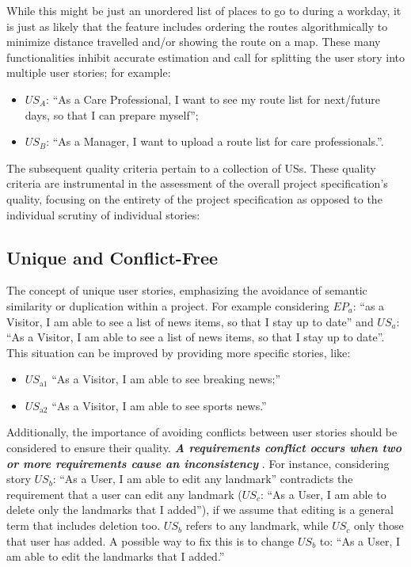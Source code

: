 While this might be just an unordered list of places to go to during a workday, it is just as likely that the feature includes ordering the routes algorithmically to minimize distance travelled and/or showing the route on a map. These many functionalities inhibit accurate estimation and call for splitting the user story into multiple user stories; for example:
\begin{itemize}
\item $US_A$: \enquote{As a Care Professional, I want to see my route list for next/future days, so that I can prepare myself};
\item $US_B$: \enquote{As a Manager, I want to upload a route list for care professionals.}.
\end{itemize}

The subsequent quality criteria pertain to a collection of USs. These quality criteria are instrumental in the assessment of the overall project specification's quality, focusing on the entirety of the project specification as opposed to the individual scrutiny of individual stories:
\subsection*{\normalsize{Unique and Conflict-Free}}
The concept of unique user stories, emphasizing the avoidance of semantic similarity or duplication within a project. For example considering $EP_a$: \enquote{as a Visitor, I am able to see a list of news items, so that I stay up to date} and $US_a$: \enquote{As a Visitor, I am able to see a list of news items, so that I stay up to date}. This situation can be improved by providing more specific stories, like:
\begin{itemize}
\item $US_{\text{a1}}$ \enquote{As a Visitor, I am able to see breaking news;}
\item $US_{\text{a2}}$ \enquote{As a Visitor, I am able to see sports news.}
\end{itemize}
Additionally, the importance of avoiding conflicts between user stories should be considered to ensure their quality. \textbf{\emph{A requirements conflict occurs when two or more requirements cause an inconsistency}} \cite{paja2013managing} \cite{robinson1989integrating}. For instance, considering story $US_b$: \enquote{As a User, I am able to edit any landmark} contradicts the requirement that a user can edit any landmark ($US_c$: \enquote{As a User, I am able to delete only the landmarks that I added}), if we assume that editing is a general term that includes deletion too. $US_b$ refers to any landmark, while  $US_c$ only those that user has added. A possible way to fix this is to change $US_b$ to: \enquote{As a User, I am able to edit the landmarks that I added.} \cite{lucassen2016improving}

